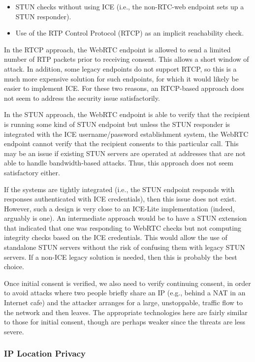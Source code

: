 \documentclass{article}
\begin{document}
\begin{itemize}
\item STUN checks without using ICE (i.e., the non-RTC-web endpoint sets
      up a STUN responder).

\item Use of the RTP Control Protocol (RTCP) as an implicit reachability
      check.
\end{itemize}

In the RTCP approach, the WebRTC endpoint is allowed to send a
limited number of RTP packets prior to receiving consent.  This
allows a short window of attack.  In addition, some legacy endpoints
do not support RTCP, so this is a much more expensive solution for
such endpoints, for which it would likely be easier to implement ICE.
For these two reasons, an RTCP-based approach does not seem to
address the security issue satisfactorily.

In the STUN approach, the WebRTC endpoint is able to verify that the
recipient is running some kind of STUN endpoint but unless the STUN
responder is integrated with the ICE username/password establishment
system, the WebRTC endpoint cannot verify that the recipient consents
to this particular call.  This may be an issue if existing STUN
servers are operated at addresses that are not able to handle
bandwidth-based attacks.  Thus, this approach does not seem
satisfactory either.

If the systems are tightly integrated (i.e., the STUN endpoint
responds with responses authenticated with ICE credentials), then
this issue does not exist.  However, such a design is very close to
an ICE-Lite implementation (indeed, arguably is one).  An
intermediate approach would be to have a STUN extension that
indicated that one was responding to WebRTC checks but not computing
integrity checks based on the ICE credentials.  This would allow the
use of standalone STUN servers without the risk of confusing them
with legacy STUN servers.  If a non-ICE legacy solution is needed,
then this is probably the best choice.

Once initial consent is verified, we also need to verify continuing
consent, in order to avoid attacks where two people briefly share an
IP (e.g., behind a NAT in an Internet cafe) and the attacker arranges
for a large, unstoppable, traffic flow to the network and then
leaves.  The appropriate technologies here are fairly similar to
those for initial consent, though are perhaps weaker since the
threats are less severe.

\subsubsection{IP Location Privacy}
\end{document}
